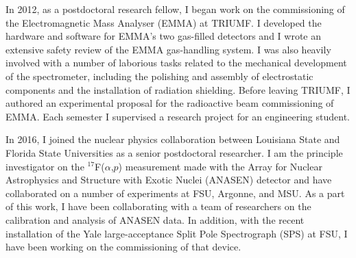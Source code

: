 {In %
 2012, as a postdoctoral research fellow, I began work on the commissioning of the Electromagnetic Mass Analyser (EMMA) %
 at TRIUMF. %
 I developed the hardware and software for 
 EMMA's two gas-filled detectors
and I wrote an extensive safety review of the EMMA gas-handling system. I was also heavily involved with a number of laborious tasks related to the mechanical development of the spectrometer, including the polishing and assembly of  electrostatic components and the installation of radiation shielding.
		Before leaving TRIUMF, I authored an experimental proposal for the radioactive beam commissioning of EMMA. Each semester I supervised a research project for an engineering student.
		
		
		In 2016, I joined the nuclear physics collaboration between Louisiana State and Florida State Universities as a senior postdoctoral researcher.
		I am the principle investigator on the $^{17}$F($\alpha$,$p$)  measurement made with the Array for Nuclear Astrophysics and Structure with Exotic Nuclei (ANASEN) detector and have collaborated on a number of experiments at FSU, Argonne, and MSU.
		As a part of this work, I have been collaborating with a team of researchers on the calibration and analysis of ANASEN data.
		In addition, with the recent installation of the Yale large-acceptance Split Pole Spectrograph (SPS) at FSU, I have been working on the commissioning of that device.


}
